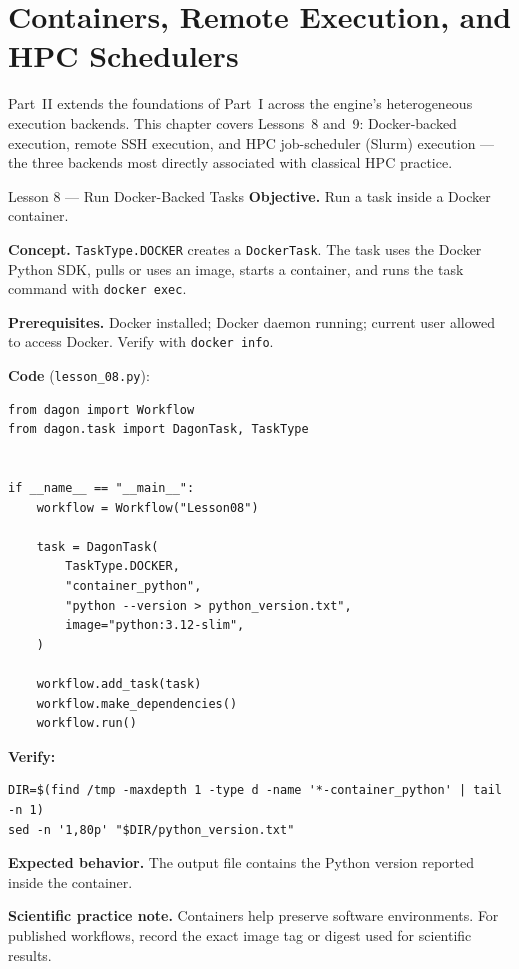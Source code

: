 \chapter{Containers, Remote Execution, and HPC Schedulers}
\label{ch:backends}

Part~II extends the foundations of Part~I across the engine's heterogeneous
execution backends. This chapter covers Lessons~8 and~9: Docker-backed
execution, remote SSH execution, and HPC job-scheduler (Slurm) execution ---
the three backends most directly associated with classical HPC practice.

\begin{lessonbox}{Lesson 8 --- Run Docker-Backed Tasks}
\textbf{Objective.} Run a task inside a Docker container.

\textbf{Concept.} \texttt{TaskType.DOCKER} creates a \texttt{DockerTask}. The
task uses the Docker Python SDK, pulls or uses an image, starts a container,
and runs the task command with \texttt{docker exec}.

\textbf{Prerequisites.} Docker installed; Docker daemon running; current user
allowed to access Docker. Verify with \texttt{docker info}.

\textbf{Code} (\texttt{lesson\_08.py}):
\begin{lstlisting}
from dagon import Workflow
from dagon.task import DagonTask, TaskType


if __name__ == "__main__":
    workflow = Workflow("Lesson08")

    task = DagonTask(
        TaskType.DOCKER,
        "container_python",
        "python --version > python_version.txt",
        image="python:3.12-slim",
    )

    workflow.add_task(task)
    workflow.make_dependencies()
    workflow.run()
\end{lstlisting}

\textbf{Verify:}
\begin{lstlisting}[style=bash]
DIR=$(find /tmp -maxdepth 1 -type d -name '*-container_python' | tail -n 1)
sed -n '1,80p' "$DIR/python_version.txt"
\end{lstlisting}

\textbf{Expected behavior.} The output file contains the Python version
reported inside the container.

\textbf{Scientific practice note.} Containers help preserve software
environments. For published workflows, record the exact image tag or digest
used for scientific results.
\end{lessonbox}

